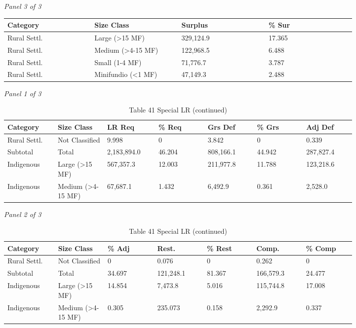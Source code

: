 \documentclass[12pt]{article}
\begin{document}
\begin{landscape}
\begin{table}[H]
\vspace{0.6em}

\textit{Panel 3 of 3}\\[2pt]
{\fontsize{12}{14}\selectfont
\setlength{\tabcolsep}{3pt}
\renewcommand{\arraystretch}{1.08}
\begin{tabular}{p{0.205\linewidth}p{0.205\linewidth}p{0.205\linewidth}p{0.205\linewidth}}
\toprule
Category & Size Class & Surplus & \% Sur \\
\midrule
Rural Settl. & Large (>15 MF) & 329,124.9 & 17.365 \\
Rural Settl. & Medium (>4-15 MF) & 122,968.5 & 6.488 \\
Rural Settl. & Small (1-4 MF) & 71,776.7 & 3.787 \\
Rural Settl. & Minifundio (<1 MF) & 47,149.3 & 2.488 \\
\bottomrule
\end{tabular}
}
\end{table}
\begin{table}[H]
\centering
\caption{Table 41 Special LR (continued)}
\textit{Panel 1 of 3}\\[2pt]
{\fontsize{12}{14}\selectfont
\setlength{\tabcolsep}{3pt}
\renewcommand{\arraystretch}{1.08}
\begin{tabular}{p{0.117\linewidth}p{0.117\linewidth}p{0.117\linewidth}p{0.117\linewidth}p{0.117\linewidth}p{0.117\linewidth}p{0.117\linewidth}}
\toprule
Category & Size Class & LR Req & \% Req & Grs Def & \% Grs & Adj Def \\
\midrule
Rural Settl. & Not Classified & 9.998 & 0 & 3.842 & 0 & 0.339 \\
Subtotal & Total & 2,183,894.0 & 46.204 & 808,166.1 & 44.942 & 287,827.4 \\
Indigenous & Large (>15 MF) & 567,357.3 & 12.003 & 211,977.8 & 11.788 & 123,218.6 \\
Indigenous & Medium (>4-15 MF) & 67,687.1 & 1.432 & 6,492.9 & 0.361 & 2,528.0 \\
\bottomrule
\end{tabular}
}

\vspace{0.6em}

\textit{Panel 2 of 3}\\[2pt]
{\fontsize{12}{14}\selectfont
\setlength{\tabcolsep}{3pt}
\renewcommand{\arraystretch}{1.08}
\begin{tabular}{p{0.117\linewidth}p{0.117\linewidth}p{0.117\linewidth}p{0.117\linewidth}p{0.117\linewidth}p{0.117\linewidth}p{0.117\linewidth}}
\toprule
Category & Size Class & \% Adj & Rest. & \% Rest & Comp. & \% Comp \\
\midrule
Rural Settl. & Not Classified & 0 & 0.076 & 0 & 0.262 & 0 \\
Subtotal & Total & 34.697 & 121,248.1 & 81.367 & 166,579.3 & 24.477 \\
Indigenous & Large (>15 MF) & 14.854 & 7,473.8 & 5.016 & 115,744.8 & 17.008 \\
Indigenous & Medium (>4-15 MF) & 0.305 & 235.073 & 0.158 & 2,292.9 & 0.337 \\
\bottomrule
\end{tabular}
}


\end{table}
\end{landscape}
\end{document}
